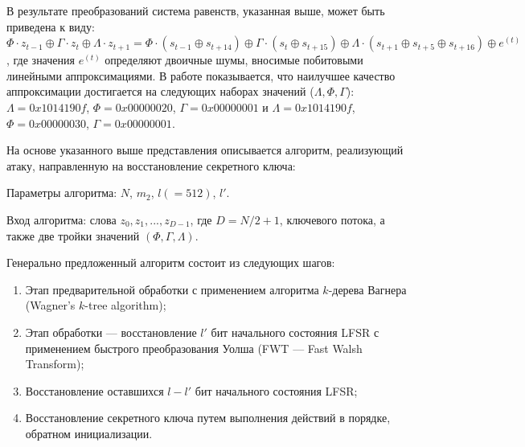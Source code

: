 \documentclass{./civarticle}
\begin{document}
\begin{enumerate}
    \begin{figure}[h!]
    \end{figure}

    В результате преобразований система равенств, указанная выше, может быть приведена к виду: $\Phi \cdot z_{t-1} \oplus \Gamma \cdot z_t \oplus \Lambda \cdot z_{t+1} = \Phi \cdot (s_{t-1} \oplus s_{t+14}) \oplus \Gamma \cdot (s_t \oplus s_{t+15}) \oplus \Lambda \cdot (s_{t+1} \oplus s_{t+5} \oplus s_{t+16}) \oplus e^{(t)}$, где значения $e^{(t)}$ определяют двоичные шумы, вносимые побитовыми линейными аппроксимациями. В работе показывается, что наилучшее качество аппроксимации достигается на следующих наборах значений ($\Lambda, \Phi, \Gamma$): $\Lambda = 0x1014190f$, $\Phi = 0x00000020$, $\Gamma = 0x00000001$ и $\Lambda = 0x1014190f$, $\Phi = 0x00000030$, $\Gamma = 0x00000001$.

    На основе указанного выше представления описывается алгоритм, реализующий атаку, направленную на восстановление секретного ключа:

    Параметры алгоритма: $N$, $m_2$, $l (= 512)$, $l'$. 
    
    Вход алгоритма: слова $z_0, z_1, ..., z_{D-1}$, где $D = N/2 + 1$, ключевого потока, а также две тройки значений $(\Phi, \Gamma, \Lambda)$. 
    
    Генерально предложенный алгоритм состоит из следующих шагов:

    \begin{enumerate}
        \item Этап предварительной обработки с применением алгоритма $k$-дерева Вагнера (Wagner’s $k$-tree algorithm);
        \item Этап обработки --- восстановление $l'$ бит начального состояния LFSR с применением быстрого преобразования Уолша (FWT --- Fast Walsh Transform);
        \item Восстановление оставшихся $l - l'$ бит начального состояния LFSR;
        \item Восстановление секретного ключа путем выполнения действий в порядке, обратном инициализации.
    \end{enumerate}
    

\end{enumerate}
\end{document}
